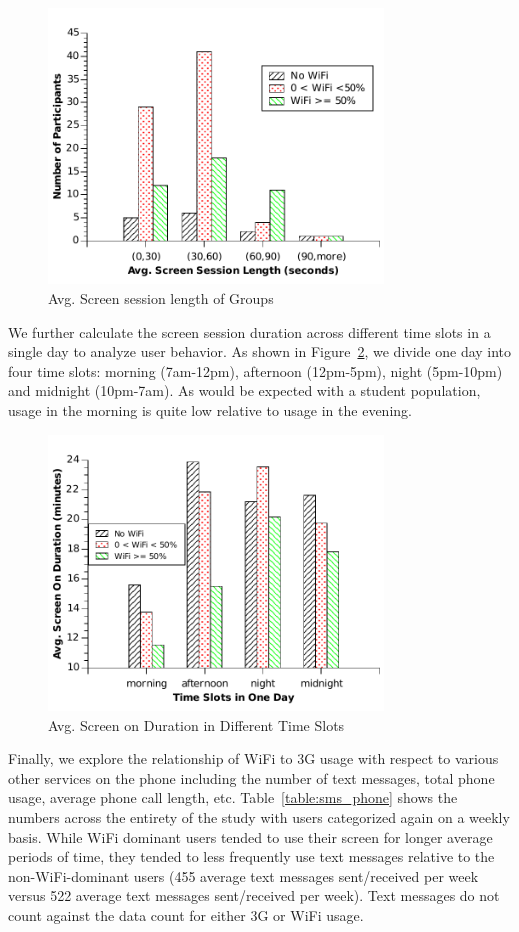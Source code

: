 \begin{figure}[h!tbp]
\centering
\includegraphics[width = 3.5in]{graphs/duration2.pdf}
\caption{Avg. Screen session length of Groups} 
\label{fig:duration}
\end{figure}

We further calculate the screen session duration across different time slots in a single day to analyze user behavior. As shown in Figure~\ref{fig:dn}, we divide one day into four time slots: morning (7am-12pm), afternoon (12pm-5pm), night (5pm-10pm) and midnight (10pm-7am).  As would
be expected with a student population, usage in the morning is quite low relative to usage in the evening.  

\begin{figure}[h!tbp]
\centering
\includegraphics[width = 3.5in]{graphs/dn2.pdf}
\caption{Avg. Screen on Duration in Different Time Slots} 
\label{fig:dn}
\end{figure}

Finally, we explore the relationship of WiFi to 3G usage with respect to various other services on the phone including the number of text
messages, total phone usage, average phone call length, etc. Table~\ref{table:sms_phone} shows the numbers across the entirety of the 
study with users categorized again on a weekly basis.  While WiFi dominant users tended to use their screen for longer
average periods of time, they tended to less frequently use text messages relative to the non-WiFi-dominant users (455 average text messages sent/received per week versus 522 average text messages sent/received per week). Text messages do not count against the data count for either 3G or WiFi usage.  

